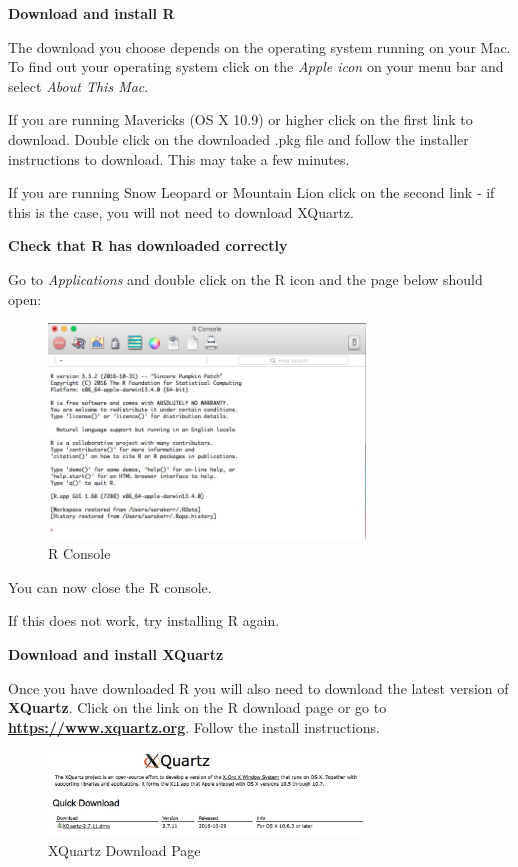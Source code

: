 \documentclass[12pt]{article}
\begin{document}
\textbf{Download and install R}

The download you choose depends on the operating system running on your Mac. To find out your operating system click on the \textit{Apple icon} on your menu bar and select \textit{About This Mac}.

If you are running Mavericks (OS X 10.9) or higher click on the first link to download. Double click on the downloaded .pkg file and follow the installer instructions to download. This may take a few minutes.

If you are running Snow Leopard or Mountain Lion click on the second link - if this is the case, you will not need to download XQuartz.

\textbf{Check that R has downloaded correctly}

Go to \textit{Applications} and double click on the R icon and the page below should open:

\begin{figure}[h]
	\centering
	\includegraphics[width=0.75\textwidth]{rconsole.jpg}
	\caption{R Console}
\end{figure}

You can now close the R console.

If this does not work, try installing R again.

\textbf{Download and install XQuartz}

Once you have downloaded R you will also need to download the latest version of \textbf{XQuartz}. Click on the link on the R download page or go to \textbf{\url{https://www.xquartz.org}}. Follow the install instructions.

\begin{figure}[h]
	\centering
	\includegraphics[width=0.75\textwidth]{xquartz.jpg}
	\caption{XQuartz Download Page}
\end{figure}
\end{document}
